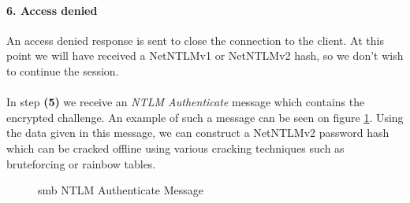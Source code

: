 \documentclass{article}
\begin{document}
\paragraph{6. Access denied} An access denied response is sent to close the connection to the client. At this point we will have received a NetNTLMv1 or NetNTLMv2 hash, so we don't wish to continue the session.
\\\\
In step \textbf{(5)} we receive an \emph{NTLM Authenticate} message which contains the encrypted challenge. An example of such a message can be seen on figure \ref{fig:smb-ntlm-authenticate}. Using the data given in this message, we can construct a NetNTLMv2 password hash which can be cracked offline using various cracking techniques such as bruteforcing or rainbow tables.

\begin{figure}[H]
	\scriptsize
	\par
	\centering
	\varwidth{\linewidth}
	
	\endvarwidth
    \par
    
    \caption{\gls{smb} NTLM Authenticate Message}
    \label{fig:smb-ntlm-authenticate}
\end{figure}

\end{document}
